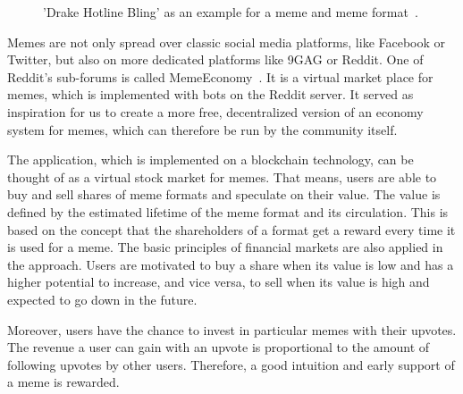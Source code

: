 \documentclass[12pt]{article}
\begin{document}
    \begin{figure}[H]
        \centering
        \caption{'Drake Hotline Bling' as an example for a meme and meme format~\cite{ImgflipMemes}.}
        \label{fig:meme_memeformat}
    \end{figure}

    Memes are not only spread over classic social media platforms, like Facebook or Twitter, but also on more dedicated platforms like 9GAG or Reddit. One of Reddit's sub-forums is called MemeEconomy~\cite{MemeEconReddit}. It is a virtual market place for memes, which is implemented with bots on the Reddit server. It served as inspiration for us to create a more free, decentralized version of an economy system for memes, which can therefore be run by the community itself.
    
    The application, which is implemented on a blockchain technology, can be thought of as a virtual stock market for memes. That means, users are able to buy and sell shares of meme formats and speculate on their value. The value is defined by the estimated lifetime of the meme format and its circulation. This is based on the concept that the shareholders of a format get a reward every time it is used for a meme. The basic principles of financial markets are also applied in the approach. Users are motivated to buy a share when its value is low and has a higher potential to increase, and vice versa, to sell when its value is high and expected to go down in the future.
    
    Moreover, users have the chance to invest in particular memes with their upvotes. The revenue a user can gain with an upvote is proportional to the amount of following upvotes by other users. Therefore, a good intuition and early support of a meme is rewarded.
    
\end{document}
